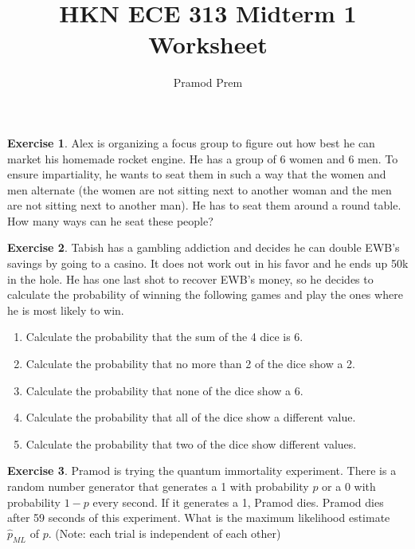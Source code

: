 \documentclass[12pt]{amsart}
\title{HKN ECE 313 Midterm 1 Worksheet}
\author{Pramod Prem}
\theoremstyle{definition}
\newtheorem{exercise}{Exercise}
\numberwithin{equation}{section}
\theoremstyle{plain}
\begin{document}
\maketitle

\begin{exercise}
Alex is organizing a focus group to figure out how best he can market his homemade rocket engine. He has a group of 6 women and 6 men. To ensure impartiality, he wants to seat them in such a way that the women and men alternate (the women are not sitting next to another woman and the men are not sitting next to another man). He has to seat them around a round table. How many ways can he seat these people?
\end{exercise}

\begin{exercise}
Tabish has a gambling addiction and decides he can double EWB's savings by going to a casino. It does not work out in his favor and he ends up 50k in the hole. He has one last shot to recover EWB's money, so he decides to calculate the probability of winning the following games and play the ones where he is most likely to win.
\begin{enumerate}[label=\Alph*.]
    \item Calculate the probability that the sum of the 4 dice is 6.
    \item Calculate the probability that no more than 2 of the dice show a 2.
    \item Calculate the probability that none of the dice show a 6.
    \item Calculate the probability that all of the dice show a different value.
    \item Calculate the probability that two of the dice show different values.
\end{enumerate}
\end{exercise}

\begin{exercise}
    Pramod is trying the quantum immortality experiment. There is a random number generator that generates a 1 with probability $p$ or a 0 with probability $1-p$ every second. If it generates a 1, Pramod dies. Pramod dies after 59 seconds of this experiment. What is the maximum likelihood estimate $\hat{p}_{ML}$ of $p$. (Note: each trial is independent of each other)
\end{exercise}
\end{document}
